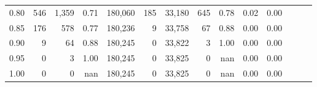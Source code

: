 \begin{tabular}{rrrrrrrrrrrrrr}
0.80 &     546 &  1,359 &  0.71 &  180,060 &      185 &  33,180 &     645 &  0.78 &  0.02 &      0.00 \\
0.85 &     176 &    578 &  0.77 &  180,236 &        9 &  33,758 &      67 &  0.88 &  0.00 &      0.00 \\
0.90 &       9 &     64 &  0.88 &  180,245 &        0 &  33,822 &       3 &  1.00 &  0.00 &      0.00 \\
0.95 &       0 &      3 &  1.00 &  180,245 &        0 &  33,825 &       0 &   nan &  0.00 &      0.00 \\
1.00 &       0 &      0 &   nan &  180,245 &        0 &  33,825 &       0 &   nan &  0.00 &      0.00 \\
\bottomrule
\end{tabular}
